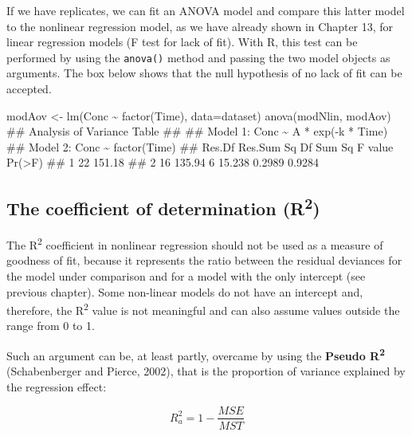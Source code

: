 \documentclass[a4paper,12pt,oneside]{book}
\newenvironment{Shaded}{\begin{snugshade}}{\end{snugshade}}
\newcommand{\SpecialCharTok}[1]{#1}
\newcommand{\DocumentationTok}[1]{#1}
\newcommand{\OtherTok}[1]{#1}
\newcommand{\FunctionTok}[1]{#1}
\newcommand{\AttributeTok}[1]{#1}
\newcommand{\NormalTok}[1]{#1}
\begin{document}
If we have replicates, we can fit an ANOVA model and compare this latter model to the nonlinear regression model, as we have already shown in Chapter 13, for linear regression models (F test for lack of fit). With R, this test can be performed by using the \texttt{anova()} method and passing the two model objects as arguments. The box below shows that the null hypothesis of no lack of fit can be accepted.

\begin{Shaded}
\begin{Highlighting}[]
\NormalTok{modAov }\OtherTok{\textless{}{-}} \FunctionTok{lm}\NormalTok{(Conc }\SpecialCharTok{\textasciitilde{}} \FunctionTok{factor}\NormalTok{(Time), }\AttributeTok{data=}\NormalTok{dataset)}
\FunctionTok{anova}\NormalTok{(modNlin, modAov)}
\DocumentationTok{\#\# Analysis of Variance Table}
\DocumentationTok{\#\# }
\DocumentationTok{\#\# Model 1: Conc \textasciitilde{} A * exp({-}k * Time)}
\DocumentationTok{\#\# Model 2: Conc \textasciitilde{} factor(Time)}
\DocumentationTok{\#\#   Res.Df Res.Sum Sq Df Sum Sq F value Pr(\textgreater{}F)}
\DocumentationTok{\#\# 1     22     151.18                         }
\DocumentationTok{\#\# 2     16     135.94  6 15.238  0.2989 0.9284}
\end{Highlighting}
\end{Shaded}

\hypertarget{the-coefficient-of-determination-r2}{%
\subsection{\texorpdfstring{The coefficient of determination (R\textsuperscript{2})}{The coefficient of determination (R2)}}\label{the-coefficient-of-determination-r2}}

The R\textsuperscript{2} coefficient in nonlinear regression should not be used as a measure of goodness of fit, because it represents the ratio between the residual deviances for the model under comparison and for a model with the only intercept (see previous chapter). Some non-linear models do not have an intercept and, therefore, the R\textsuperscript{2} value is not meaningful and can also assume values outside the range from 0 to 1.

Such an argument can be, at least partly, overcame by using the \textbf{Pseudo R\textsuperscript{2}} (Schabenberger and Pierce, 2002), that is the proportion of variance explained by the regression effect:

\[R_a^2  = 1 - \frac{MSE}{MST}\]
\end{document}
